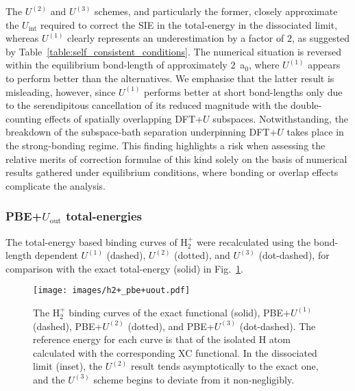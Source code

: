 The $U^{(2)}$ and $U^{(3)}$ 
schemes, and particularly the former, 
closely approximate the $U_\textrm{int}$ required 
to correct the SIE in the total-energy in the dissociated limit,
whereas $U^{(1)}$  clearly represents 
an underestimation by a factor of  $2$, 
as suggested by Table~\ref{table:self_consistent_conditions}.
%
The numerical situation is reversed within the equilibrium 
bond-length of approximately $2$~a$_0$,
where $U^{(1)}$ appears to perform better than the alternatives.
%
We emphasise that the latter result is 
misleading, however, 
since $U^{(1)}$ performs better
at short bond-lengths
only due to the serendipitous cancellation 
of its reduced magnitude  
with the double-counting effects of spatially
overlapping DFT+$U$ subspaces.
%
Notwithstanding, 
the breakdown of the subspace-bath separation 
underpinning  DFT+$U$ takes place in the strong-bonding regime.
%
This finding highlights a risk when assessing the relative
merits of correction formulae of this kind solely on the basis 
of numerical results gathered under equilibrium conditions, 
where bonding or overlap effects complicate the analysis.


\subsubsection{PBE+$U_\textrm{out}$ total-energies}


The total-energy based 
binding curves of H$_2^+$ were recalculated 
using the bond-length dependent 
$U^{(1)}$ (dashed), 
$U^{(2)}$ (dotted), 
and $U^{(3)}$ (dot-dashed), for comparison with
the exact total-energy (solid) in Fig.~\ref{fig:h2+_pbe+uout}.

\begin{figure}[th!]
\centering
\texttt{[image: images/h2+\_pbe+uout.pdf]}
\caption[Binding energy of H$_2^+$ calculated 
with various $U_\textrm{out}$ schemes]
{The H$_2^+$ binding  curves 
of the exact functional (solid),
PBE+$U^{(1)}$ (dashed), 
PBE+$U^{(2)}$ (dotted), 
and PBE+$U^{(3)}$ (dot-dashed).
%
The reference energy for each curve 
is that of the isolated H atom calculated with 
the corresponding XC functional.
% 
In the dissociated limit (inset),  
the $U^{(2)}$ result tends asymptotically to the exact one,
and the  $U^{(3)}$ scheme begins to deviate from it non-negligibly.}
\label{fig:h2+_pbe+uout}
\end{figure}
%


